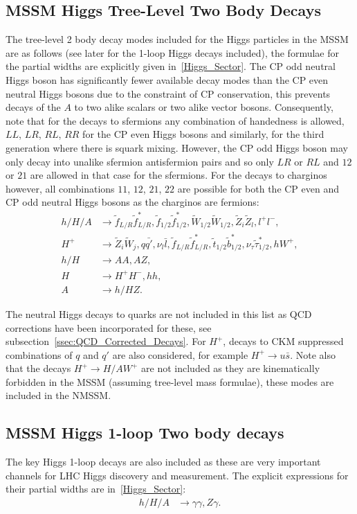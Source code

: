 \documentclass[final,3p,times]{elsarticle}
\begin{document}
\subsection{MSSM Higgs Tree-Level Two Body Decays}
The tree-level 2 body decay modes included for the Higgs particles in the
MSSM are as follows (see later for the 1-loop Higgs decays included), the
formulae for the partial widths are explicitly given in~\ref{Higgs_Sector}. The CP odd neutral Higgs boson has significantly fewer available decay modes than the CP even neutral Higgs bosons due to the constraint of CP conservation, this prevents decays of the $A$ to two alike scalars or two alike vector bosons. Consequently, note that for the decays to sfermions any combination of handedness is allowed, $LL$, $LR$, $RL$, $RR$ for the CP even Higgs bosons and similarly, for the third generation where
there is squark mixing. However, the CP odd Higgs boson may only decay into unalike sfermion antisfermion pairs and so only $LR$ or $RL$ and $12$ or $21$ are allowed in that case for the sfermions. For the decays to charginos however, all combinations $11$,
$12$, $21$, $22$ are possible for both the CP even and CP odd neutral Higgs
bosons as the charginos are fermions: 
\begin{align*}
h/H/A &\rightarrow \tilde{f}_{L/R} \tilde{f}_{L/R}^*, \tilde{f}_{1/2} \tilde{f}_{1/2}^*, \tilde{W}_{1/2} \tilde{W}_{1/2}, \tilde{Z}_{i} \tilde{Z}_{l}, l^+ l^-, \\
H^+ &\rightarrow \tilde{Z}_{i} \tilde{W}_{j}, q \bar{q'}, \nu_{l} \bar{l}, \tilde{f}_{L/R} \tilde{f}_{L/R}^*, \tilde{t}_{1/2} \tilde{b}_{1/2}^*, \nu_{\tau} \tilde{\tau}_{1/2}^*, h W^+,\\
h/H &\rightarrow A A, A Z, \\
H &\rightarrow H^+ H^-, hh, \\
A &\rightarrow h/H Z.
\end{align*}

The neutral Higgs decays to quarks are not included in this list as QCD corrections have been incorporated for these, see subsection~\ref{ssec:QCD_Corrected_Decays}.
For $H^+$, decays to CKM suppressed combinations of $q$ and $q'$ are also considered, for example $H^+ \rightarrow u \bar{s}$. Note also that the decays $H^+ \rightarrow H/A W^+$ are not included as they are kinematically forbidden in the MSSM (assuming tree-level mass formulae), these modes are included in the NMSSM.

\subsection{MSSM Higgs 1-loop Two body decays}
The key Higgs 1-loop decays are also included as these are very important 
channels for LHC Higgs discovery and measurement. The explicit expressions for
their partial widths are in~\ref{Higgs_Sector}:
\begin{align*}
h/H/A &\rightarrow \gamma\gamma, Z\gamma.
\end{align*}
\end{document}
